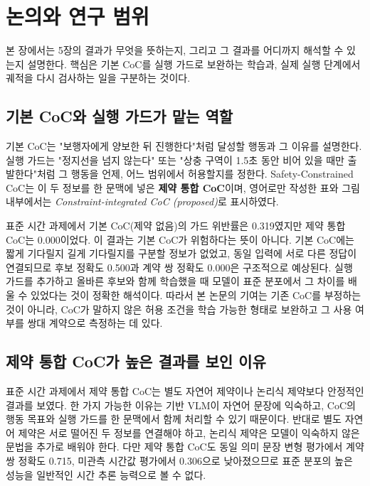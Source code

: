 \section{논의와 연구 범위}
\label{sec:discussion}

본 장에서는 5장의 결과가 무엇을 뜻하는지, 그리고 그 결과를 어디까지 해석할 수 있는지 설명한다. 핵심은 기본 CoC를 실행 가드로 보완하는 학습과, 실제 실행 단계에서 궤적을 다시 검사하는 일을 구분하는 것이다.

\subsection{기본 CoC와 실행 가드가 맡는 역할}

기본 CoC는 "보행자에게 양보한 뒤 진행한다"처럼 달성할 행동과 그 이유를 설명한다. 실행 가드는 "정지선을 넘지 않는다" 또는 "상충 구역이 1.5초 동안 비어 있을 때만 출발한다"처럼 그 행동을 언제, 어느 범위에서 허용할지를 정한다. Safety-Constrained CoC는 이 두 정보를 한 문맥에 넣은 \textbf{제약 통합 CoC}이며, 영어로만 작성한 표와 그림 내부에서는 \textit{Constraint-integrated CoC (proposed)}로 표시하였다.

표준 시간 과제에서 기본 CoC(제약 없음)의 가드 위반률은 0.319였지만 제약 통합 CoC는 0.000이었다. 이 결과는 기본 CoC가 위험하다는 뜻이 아니다. 기본 CoC에는 짧게 기다릴지 길게 기다릴지를 구분할 정보가 없었고, 동일 입력에 서로 다른 정답이 연결되므로 후보 정확도 0.500과 계약 쌍 정확도 0.000은 구조적으로 예상된다. 실행 가드를 추가하고 올바른 후보와 함께 학습했을 때 모델이 표준 분포에서 그 차이를 배울 수 있었다는 것이 정확한 해석이다. 따라서 본 논문의 기여는 기존 CoC를 부정하는 것이 아니라, CoC가 말하지 않은 허용 조건을 학습 가능한 형태로 보완하고 그 사용 여부를 쌍대 계약으로 측정하는 데 있다.

\subsection{제약 통합 CoC가 높은 결과를 보인 이유}

표준 시간 과제에서 제약 통합 CoC는 별도 자연어 제약이나 논리식 제약보다 안정적인 결과를 보였다. 한 가지 가능한 이유는 기반 VLM이 자연어 문장에 익숙하고, CoC의 행동 목표와 실행 가드를 한 문맥에서 함께 처리할 수 있기 때문이다. 반대로 별도 자연어 제약은 서로 떨어진 두 정보를 연결해야 하고, 논리식 제약은 모델이 익숙하지 않은 문법을 추가로 배워야 한다. 다만 제약 통합 CoC도 동일 의미 문장 변형 평가에서 계약 쌍 정확도 0.715, 미관측 시간값 평가에서 0.306으로 낮아졌으므로 표준 분포의 높은 성능을 일반적인 시간 추론 능력으로 볼 수 없다.


